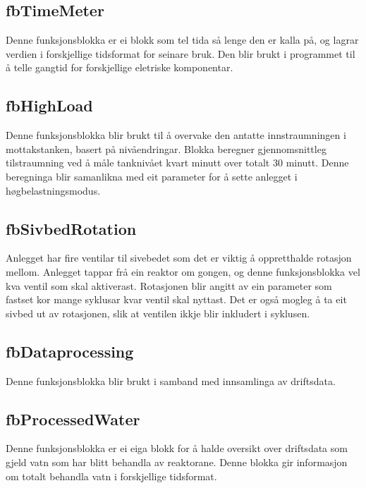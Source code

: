 \subsection{fbTimeMeter}
Denne funksjonsblokka er ei blokk som tel tida så lenge den er kalla på, og lagrar verdien i forskjellige tidsformat for seinare bruk.
Den blir brukt i programmet til å telle gangtid for forskjellige eletriske komponentar.

\newpage

\subsection{fbHighLoad}
Denne funksjonsblokka blir brukt til å overvake den antatte innstraumningen i mottakstanken, basert på nivåendringar.
Blokka beregner gjennomsnittleg tilstraumning ved å måle tanknivået kvart minutt over totalt 30 minutt.
Denne beregninga blir samanlikna med eit parameter  for å sette anlegget i høgbelastningsmodus.

\subsection{fbSivbedRotation}
Anlegget har fire ventilar til sivebedet som det er viktig å oppretthalde rotasjon mellom. Anlegget tappar frå ein reaktor om gongen, 
og denne funksjonsblokka vel kva ventil som skal aktiverast.
Rotasjonen blir angitt av ein parameter som fastset kor mange syklusar kvar ventil skal nyttast. 
Det er også mogleg å ta eit sivbed ut av rotasjonen, slik at ventilen ikkje blir inkludert i syklusen.

\subsection{fbDataprocessing}
Denne funksjonsblokka blir brukt i samband med innsamlinga av driftsdata. 

\subsection{fbProcessedWater}
Denne funksjonsblokka er ei eiga blokk for å halde oversikt over driftsdata som gjeld vatn som har blitt behandla av reaktorane. 
Denne blokka gir informasjon om totalt behandla vatn i forskjellige tidsformat.

\newpage


